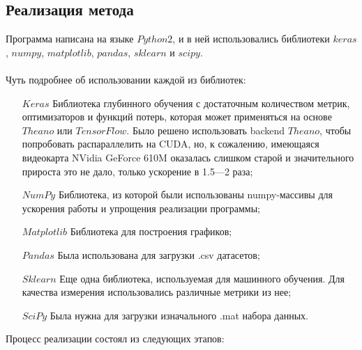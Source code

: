 \documentclass[russian,english,18pt,a4paper,reqno,dviphfm]{article}
\begin{document}
\subsection{Реализация метода}
Программа написана на языке $Python 2$, и в ней использовались библиотеки $keras$, $numpy$, $matplotlib$, $pandas$, $sklearn$ и $scipy$. \\\\
Чуть подробнее об использовании каждой из библиотек:
\begin{itemize}
	\item[$Keras$] Библиотека глубинного обучения с достаточным количеством метрик, оптимизаторов и функций потерь, которая может применяться на основе $Theano$ или $TensorFlow$. Было решено использовать backend $Theano$, чтобы попробовать распараллелить на CUDA, но, к сожалению, имеющаяся видеокарта NVidia GeForce 610M оказалась слишком старой и значительного прироста это не дало, только ускорение в 1.5---2 раза;
	\item[$NumPy$] Библиотека, из которой были использованы numpy-массивы для ускорения работы и упрощения реализации программы;
	\item[$Matplotlib$] Библиотека для построения графиков;
	\item[$Pandas$] Была использована для загрузки .csv датасетов;
	\item[$Sklearn$] Еще одна библиотека, используемая для машинного обучения. Для качества измерения использовались различные метрики из нее;
	\item[$SciPy$] Была нужна для загрузки изначального .mat набора данных.
\end{itemize}
Процесс реализации состоял из следующих этапов:
\end{document}
